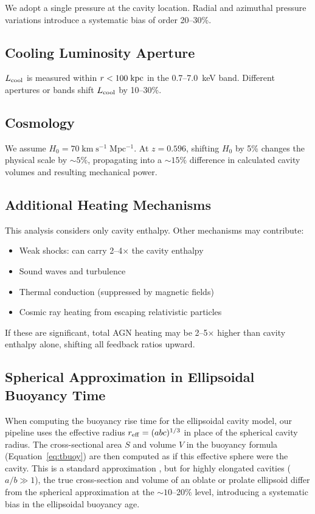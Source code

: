 \documentclass[twocolumn]{aastex63}
\newcommand{\Lcool}{L_{\rm cool}}
\newcommand{\kpc}{\rm kpc}
\begin{document}
We adopt a single pressure at the cavity location. Radial and azimuthal pressure
variations introduce a systematic bias of order 20--30\%.

\subsection{Cooling Luminosity Aperture}

$\Lcool$ is measured within $r < 100\;\kpc$ in the 0.7--7.0~keV band. Different
apertures or bands shift $\Lcool$ by 10--30\%.

\subsection{Cosmology}

We assume $H_0 = 70\;\mathrm{km\;s^{-1}\;Mpc^{-1}}$. At $z = 0.596$, shifting
$H_0$ by 5\% changes the physical scale by ${\sim}5\%$, propagating into a
${\sim}15\%$ difference in calculated cavity volumes and resulting mechanical
power.

\subsection{Additional Heating Mechanisms}

This analysis considers only cavity enthalpy. Other mechanisms may contribute:
\begin{itemize}
  \item Weak shocks: can carry 2--4$\times$ the cavity enthalpy
    \citep{Nulsen2005}
  \item Sound waves and turbulence \citep{Fabian2017}
  \item Thermal conduction (suppressed by magnetic fields)
  \item Cosmic ray heating from escaping relativistic particles
\end{itemize}
If these are significant, total AGN heating may be 2--5$\times$ higher than
cavity enthalpy alone, shifting all feedback ratios upward.

\subsection{Spherical Approximation in Ellipsoidal Buoyancy Time}

When computing the buoyancy rise time for the ellipsoidal cavity model, our
pipeline uses the effective radius $r_{\rm eff} = (abc)^{1/3}$ in place of the
spherical cavity radius. The cross-sectional area $S$ and volume $V$ in the
buoyancy formula (Equation~\ref{eq:tbuoy}) are then computed as if this
effective sphere were the cavity. This is a standard approximation
\citep{Birzan2004, Hlavacek-Larrondo2015}, but for highly elongated cavities
($a/b \gg 1$), the true cross-section and volume of an oblate or prolate
ellipsoid differ from the spherical approximation at the ${\sim}10$--20\% level,
introducing a systematic bias in the ellipsoidal buoyancy age.
\end{document}
